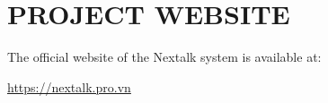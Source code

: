 \documentclass[12pt, a4paper]{article}
\begin{document}

\newpage

\appendix

\section{PROJECT WEBSITE}

The official website of the Nextalk system is available at:

\begin{center}
    \url{https://nextalk.pro.vn}
\end{center}

\end{document}
